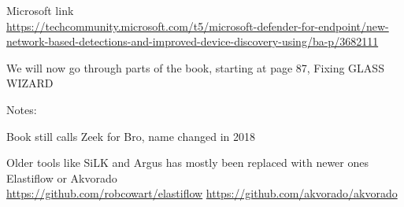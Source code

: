 \documentclass[Screen16to9,17pt]{foils}
\begin{document}
\begin{list2}
\item Microsoft link\\{\scriptsize
\url{https://techcommunity.microsoft.com/t5/microsoft-defender-for-endpoint/new-network-based-detections-and-improved-device-discovery-using/ba-p/3682111}}
\end{list2}



We will now go through parts of the book, starting at page 87, Fixing GLASS WIZARD
\begin{quote}

\end{quote}

Notes:
\begin{list2}
\item Book still calls Zeek for Bro, name changed in 2018
\item Older tools like SiLK and Argus has mostly been replaced with newer ones Elastiflow or Akvorado\\
\url{https://github.com/robcowart/elastiflow} \url{https://github.com/akvorado/akvorado}
\end{list2}



\end{document}
